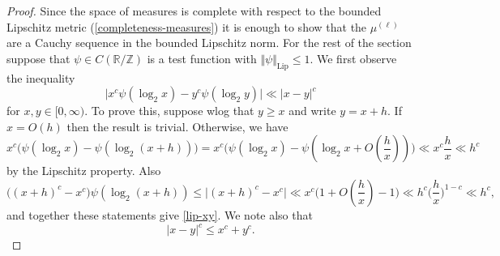 \documentclass[11pt,reqno]{amsart}
\numberwithin{equation}{section}
\theoremstyle{definition}
\theoremstyle{remark}
\renewcommand{\le}{\leqslant}
\renewcommand{\ge}{\geqslant}
\newcommand\Z{\mathbb{Z}}
\newcommand\R{\mathbb{R}}
\newcommand\Lip{\operatorname{Lip}}
\begin{document}
\begin{proof} Since the space of measures is complete with respect to the bounded Lipschitz metric (\cref{completeness-measures}) it is enough to show that the $\mu^{(\ell)}$ are a Cauchy sequence in the bounded Lipschitz norm. For the rest of the section suppose that $\psi \in C(\R/\Z)$ is a test function with $\Vert \psi \Vert_{\Lip} \le 1$.
We first observe the inequality 
\begin{equation}\label{lip-xy} \big| x^c \psi(\log_2 x) - y^c \psi(\log_2 y) \big| \ll |x - y|^c\end{equation} for $x,y \in [0,\infty)$. To prove this, suppose wlog that $y \ge x$ and write $y = x + h$. If $x = O(h)$ then the result is trivial. Otherwise, we have
\[ x^c \big( \psi (\log_2 x) - \psi(\log_2(x + h))\big) = x^c \big( \psi(\log_2 x) - \psi(\log_2 x + O(\frac{h}{x})) \big) \ll x^c \frac{h}{x} \ll h^c\] by the Lipschitz property. Also
\[ \big( (x + h)^c - x^c\big) \psi(\log_2(x + h)) \le \big| (x + h)^c - x^c\big| \ll x^c \big(1 + O(\frac{h}{x}) - 1\big) \ll h^c \big( \frac{h}{x}\big)^{1 - c} \ll h^c,\] and together these statements give \cref{lip-xy}. 
We note also that
\begin{equation}\label{simple-real-var} |x - y|^c \le x^c + y^c.\end{equation}


\end{proof}
\end{document}
